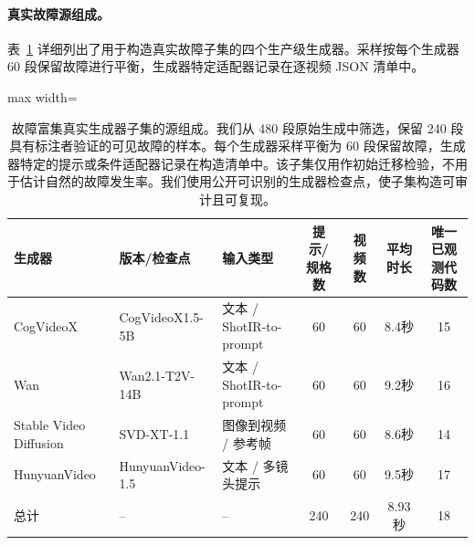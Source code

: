 \documentclass{article}
\begin{document}
\begin{table}[t]
\centering\scriptsize
\caption{故障富集真实生成器子集的源组成。我们从 480 段原始生成中筛选，保留 240 段具有标注者验证的可见故障的样本。每个生成器采样平衡为 60 段保留故障，生成器特定的提示或条件适配器记录在构造清单中。该子集仅用作初始迁移检验，不用于估计自然的故障发生率。我们使用公开可识别的生成器检查点，使子集构造可审计且可复现。}
\paragraph{真实故障源组成。}
表~\ref{tab:real_failure_source} 详细列出了用于构造真实故障子集的四个生产级生成器。采样按每个生成器 60 段保留故障进行平衡，生成器特定适配器记录在逐视频 JSON 清单中。

\label{tab:real_failure_source}
\begin{adjustbox}{max width=\textwidth}
\begin{tabular}{p{}p{}p{}cccc}
\toprule
生成器 & 版本/检查点 & 输入类型 & 提示/规格数 & 视频数 & 平均时长 & 唯一已观测代码数 \\
\midrule
CogVideoX & CogVideoX1.5-5B & 文本 / ShotIR-to-prompt & 60 & 60 & 8.4秒 & 15 \\
Wan & Wan2.1-T2V-14B & 文本 / ShotIR-to-prompt & 60 & 60 & 9.2秒 & 16 \\
Stable Video Diffusion & SVD-XT-1.1 & 图像到视频 / 参考帧 & 60 & 60 & 8.6秒 & 14 \\
HunyuanVideo & HunyuanVideo-1.5 & 文本 / 多镜头提示 & 60 & 60 & 9.5秒 & 17 \\
\midrule
总计 & -- & -- & 240 & 240 & 8.93秒 & 18 \\
\bottomrule
\end{tabular}
\end{adjustbox}
\end{table}
\end{document}
